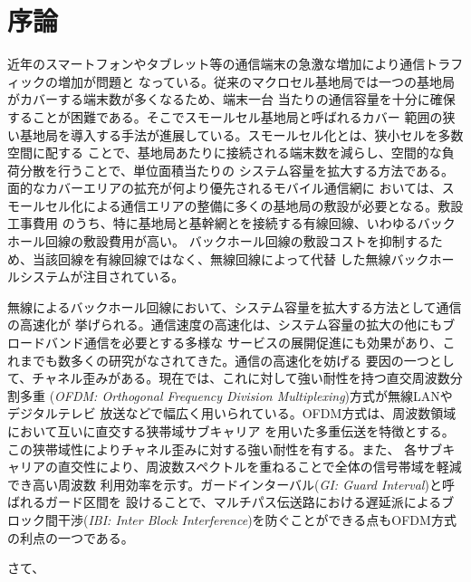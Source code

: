 \chapter{序論}

近年のスマートフォンやタブレット等の通信端末の急激な増加により通信トラフィックの増加が問題と
なっている。従来のマクロセル基地局では一つの基地局がカバーする端末数が多くなるため、端末一台
当たりの通信容量を十分に確保することが困難である。そこでスモールセル基地局と呼ばれるカバー
範囲の狭い基地局を導入する手法が進展している。スモールセル化とは、狭小セルを多数空間に配する
ことで、基地局あたりに接続される端末数を減らし、空間的な負荷分散を行うことで、単位面積当たりの
システム容量を拡大する方法である。面的なカバーエリアの拡充が何より優先されるモバイル通信網に
おいては、スモールセル化による通信エリアの整備に多くの基地局の敷設が必要となる。敷設工事費用
のうち、特に基地局と基幹網とを接続する有線回線、いわゆるバックホール回線の敷設費用が高い。
バックホール回線の敷設コストを抑制するため、当該回線を有線回線ではなく、無線回線によって代替
した無線バックホールシステムが注目されている。

無線によるバックホール回線において、システム容量を拡大する方法として通信の高速化が
挙げられる。通信速度の高速化は、システム容量の拡大の他にもブロードバンド通信を必要とする多様な
サービスの展開促進にも効果があり、これまでも数多くの研究がなされてきた。通信の高速化を妨げる
要因の一つとして、チャネル歪みがある。現在では、これに対して強い耐性を持つ直交周波数分割多重
(\emph{OFDM: Orthogonal Frequency Division Multiplexing})方式が無線LANやデジタルテレビ
放送などで幅広く用いられている。OFDM方式は、周波数領域において互いに直交する狭帯域サブキャリア
を用いた多重伝送を特徴とする。この狭帯域性によりチャネル歪みに対する強い耐性を有する。また、
各サブキャリアの直交性により、周波数スペクトルを重ねることで全体の信号帯域を軽減でき高い周波数
利用効率を示す。ガードインターバル(\emph{GI: Guard Interval})と呼ばれるガード区間を
設けることで、マルチパス伝送路における遅延派によるブロック間干渉(\emph{IBI: Inter Block
Interference})を防ぐことができる点もOFDM方式の利点の一つである。

さて、